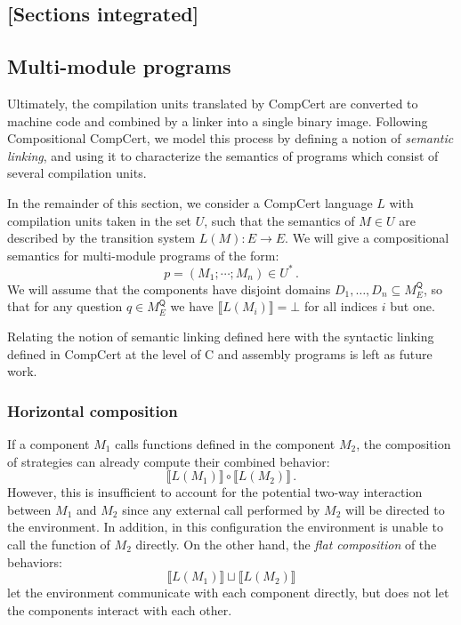 \documentclass[format=sigplan,authordraft]{acmart}
\newcommand{\kw}[1]{\ensuremath{ \mathsf{#1} }}
\begin{document}
\subsection*{[Sections integrated]}

\subsection{Multi-module programs}

Ultimately,
the compilation units translated by CompCert
are converted to machine code
and combined by a linker into a single
binary image.
Following Compositional CompCert,
we model this process by defining a notion of
\emph{semantic linking},
and using it to characterize the semantics
of programs which consist of several compilation units.

In the remainder of this section,
we consider a CompCert language $L$
with compilation units taken in the set $U$,
such that the semantics of $M \in U$
are described by the transition system $L(M) : E \rightarrow E$.
We will give a compositional semantics
for multi-module programs of the form:
\[
    p = (M_1; \cdots; M_n) \in U^* \,.
\]
We will assume that the components have disjoint domains
$D_1, \ldots, D_n \subseteq M_E^\kw{Q}$,
so that for any question $q \in M_E^\kw{Q}$
we have $\llbracket L(M_i) \rrbracket = \bot$
for all indices $i$ but one.

Relating the notion of semantic linking defined here
with the syntactic linking defined in CompCert
at the level of C and assembly programs
is left as future work.

\subsubsection{Horizontal composition}

If a component $M_1$ calls functions defined
in the component $M_2$,
the composition of strategies
can already compute their combined behavior:
\[
    \llbracket L(M_1) \rrbracket \circ
    \llbracket L(M_2) \rrbracket \,.
\]
However,
this is insufficient to account for
the potential two-way interaction between $M_1$ and $M_2$
since any external call performed by $M_2$
will be directed to the environment.
In addition,
in this configuration the environment
is unable to call the function of $M_2$ directly.
On the other hand,
the \emph{flat composition} of the behaviors:
\[
    \llbracket L(M_1) \rrbracket \sqcup
    \llbracket L(M_2) \rrbracket
\]
let the environment communicate with each component directly,
but does not let the components interact with each other.
\end{document}

